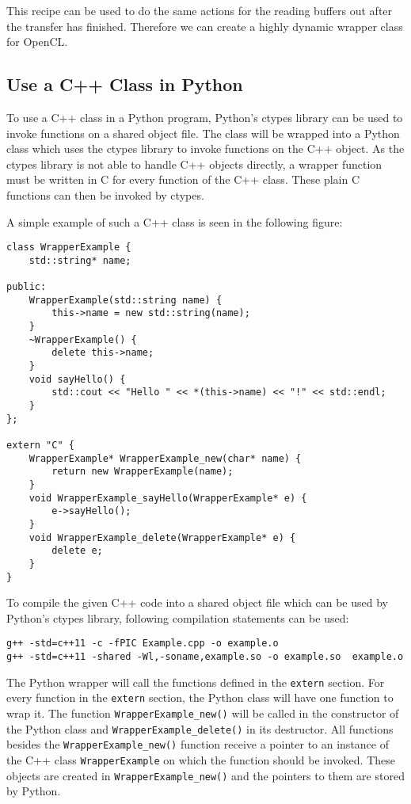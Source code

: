 \documentclass{acm_proc_article-sp}
\begin{document}
This recipe can be used to do the same actions for the reading buffers out after the transfer has finished.
Therefore we can create a highly dynamic wrapper class for OpenCL.

\subsection{Use a C++ Class in Python}
To use a C++ class in a Python program, Python's ctypes library can be used to invoke functions on a shared object file. The class will be wrapped into a Python class which uses the ctypes library to invoke functions on the C++ object. As the ctypes library is not able to handle C++ objects directly, a wrapper function must be written in C for every function of the C++ class. These plain C functions can then be invoked by ctypes.

A simple example of such a C++ class is seen in the following figure:

\begin{lstlisting}[caption=Example C++ class for wrapping a C++ object in a Python object (Example.cpp)]
class WrapperExample {
    std::string* name;

public:
    WrapperExample(std::string name) {
        this->name = new std::string(name);
    }
    ~WrapperExample() {
        delete this->name;
    }
    void sayHello() {
        std::cout << "Hello " << *(this->name) << "!" << std::endl;
    }
};

extern "C" {
    WrapperExample* WrapperExample_new(char* name) {
        return new WrapperExample(name);
    }
    void WrapperExample_sayHello(WrapperExample* e) {
        e->sayHello();
    }
    void WrapperExample_delete(WrapperExample* e) {
        delete e;
    }
}
\end{lstlisting}

To compile the given C++ code into a shared object file which can be used by Python's ctypes library, following compilation statements can be used:

\lstset{language= bash}
\begin{lstlisting}[caption=Compilation of the C++ class into a shared object file]
g++ -std=c++11 -c -fPIC Example.cpp -o example.o
g++ -std=c++11 -shared -Wl,-soname,example.so -o example.so  example.o
\end{lstlisting}

The Python wrapper will call the functions defined in the \texttt{extern} section. For every function in the \texttt{extern} section, the Python class will have one function to wrap it. The function \texttt{WrapperExample\_new()} will be called in the constructor of the Python class and \texttt{WrapperExample\_delete()} in its  destructor. All functions besides the \texttt{WrapperExample\_new()} function receive a pointer to an instance of the C++ class \texttt{WrapperExample} on which the function should be invoked. These objects are created in \texttt{WrapperExample\_new()} and the pointers to them are stored by Python.
\end{document}
